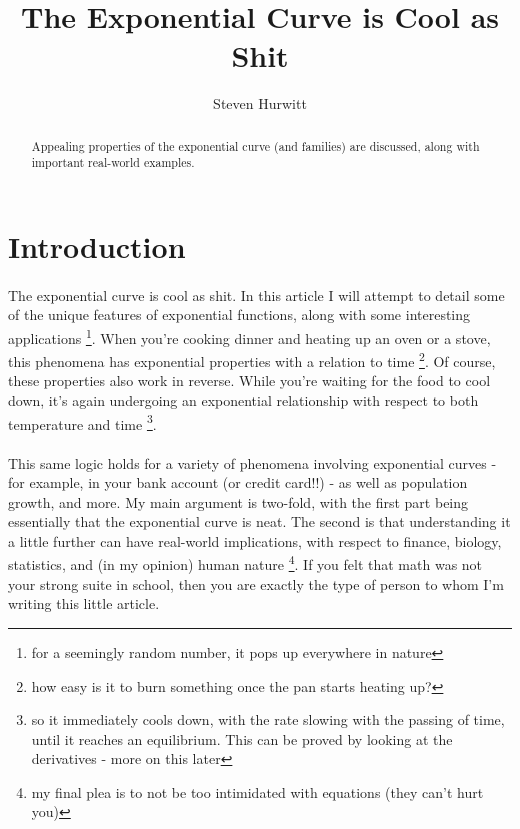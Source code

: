 \documentclass{cup-pan}
\title{The Exponential Curve is Cool as Shit}
\author[1]{Steven Hurwitt}
\affil[1]{M.S. Statistics University of Illinois, Urbana-Champaign, 240 W. 23rd St. Houston, TX. Email: \url{stevenhurwitt@gmail.com}}
\begin{document}
\maketitle

\begin{abstract}
Appealing properties of the exponential curve (and families) are discussed, along with important real-world examples.
\end{abstract}



\section{Introduction}
\label{sec:intro}
\paragraph{}
The exponential curve is cool as shit. In this article I will attempt to detail some of the unique features of exponential functions, along with some interesting applications \footnote{for a seemingly random number, it pops up everywhere in nature}. When you're cooking dinner and heating up an oven or a stove, this phenomena has exponential properties with a relation to time \footnote{how easy is it to burn something once the pan starts heating up?}. Of course, these properties also work in reverse. While you're waiting for the food to cool down, it's again undergoing an exponential relationship with respect to both temperature and time \footnote{so it immediately cools down, with the rate slowing with the passing of time, until it reaches an equilibrium. This can be proved by looking at the derivatives - more on this later}.

\paragraph{}
This same logic holds for a variety of phenomena involving exponential curves - for example, in your bank account (or credit card!!) - as well as population growth, and more. My main argument is two-fold, with the first part being essentially that the exponential curve is neat. The second is that understanding it a little further can have real-world implications, with respect to finance, biology, statistics, and (in my opinion) human nature \footnote{my final plea is to not be too intimidated with equations (they can't hurt you)}. If you felt that math was not your strong suite in school, then you are exactly the type of person to whom I'm writing this little article.
\end{document}
